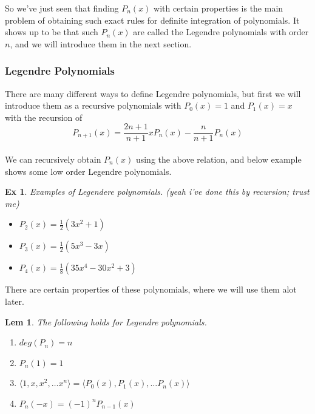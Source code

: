 \documentclass[paper=a4, fontsize=11pt]{scrartcl}
\newtheorem{example}{Ex}
\newtheorem{lemma}{Lem}
\begin{document}
So we've just seen that finding $P_n(x)$ with certain properties is the main problem of obtaining such exact rules for definite integration of polynomials. It shows up to be that such $P_n(x)$ are called the Legendre polynomials with order $n$, and we will introduce them in the next section.\\

\vspace{0.15in}
\subsubsection{Legendre Polynomials}
\vspace{0.15in}

There are many different ways to define Legendre polynomials, but first we will introduce them as a recursive polynomials with $P_0(x) = 1$ and $P_1(x) =x$ with the recursion of \\

\begin{equation}\nonumber
	P_{n+1} (x) = \frac{2n+1}{n+1}x P_n(x) - \frac{n}{n+1}P_n(x)
\end{equation}\\

We can recursively obtain $P_n(x)$ using the above relation, and below example shows some low order Legendre polynomials.\\

\begin{example}
	Examples of Legendere polynomials. (yeah i've done this by recursion; trust me)
	\begin{itemize}
		\item $P_2(x) = \frac{1}{2}(3x^2+1)$
		\item $P_3(x) = \frac{1}{2}(5x^3-3x)$
		\item $P_4(x) = \frac{1}{8}(35x^4 - 30x^2 +3) $\\
	\end{itemize}
\end{example}

There are certain properties of these polynomials, where we will use them alot later. \\

\begin{lemma}
The following holds for Legendre polynomials.
\begin{enumerate}[label = T\arabic*.]
\item $deg(P_n)=n$
\item $P_n(1)=1$
\item $\langle 1, x, x^2, \dots x^n \rangle = \langle P_0(x), P_1(x) , \dots P_n(x) \rangle$
\item $P_n(-x)=(-1)^n P_{n-1}(x)$\\
\end{enumerate}
\end{lemma}
\end{document}
